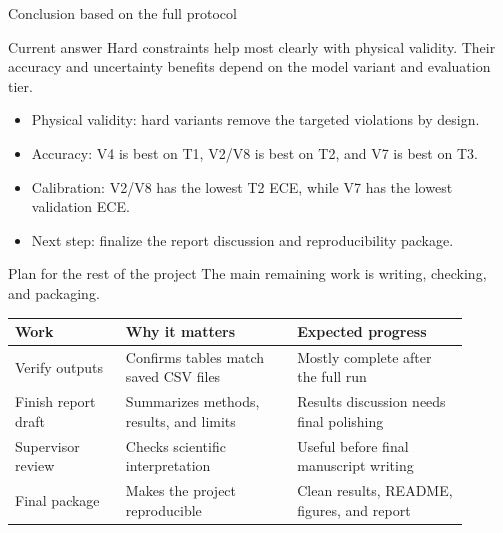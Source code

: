 \documentclass[aspectratio=169,10pt]{beamer}
\newcommand{\smallgray}[1]{\textcolor{projectGray}{#1}}
\begin{document}
\begin{frame}{Conclusion based on the full protocol}
  \begin{block}{Current answer}
    Hard constraints help most clearly with physical validity. Their accuracy
    and uncertainty benefits depend on the model variant and evaluation tier.
  \end{block}

  \vspace{0.25cm}
  {\small
    \begin{itemize}
      \item Physical validity: hard variants remove the targeted violations by design.
      \item Accuracy: V4 is best on T1, V2/V8 is best on T2, and V7 is best on T3.
      \item Calibration: V2/V8 has the lowest T2 ECE, while V7 has the lowest validation ECE.
      \item Next step: finalize the report discussion and reproducibility package.
    \end{itemize}}
\end{frame}

\begin{frame}{Plan for the rest of the project}
  \smallgray{The main remaining work is writing, checking, and packaging.}

  \vspace{0.25cm}
  \begin{table}
    \centering
    \scriptsize
    \begin{tabular}{p{0.22\linewidth}p{0.34\linewidth}p{0.34\linewidth}}
      \toprule
      \textbf{Work}         & \textbf{Why it matters}                      & \textbf{Expected progress}                         \\
      \midrule
      Verify outputs      & Confirms tables match saved CSV files       & Mostly complete after the full run          \\
      Finish report draft & Summarizes methods, results, and limits     & Results discussion needs final polishing    \\
      Supervisor review   & Checks scientific interpretation            & Useful before final manuscript writing      \\
      Final package       & Makes the project reproducible              & Clean results, README, figures, and report  \\
      \bottomrule
    \end{tabular}
  \end{table}
\end{frame}
\end{document}
